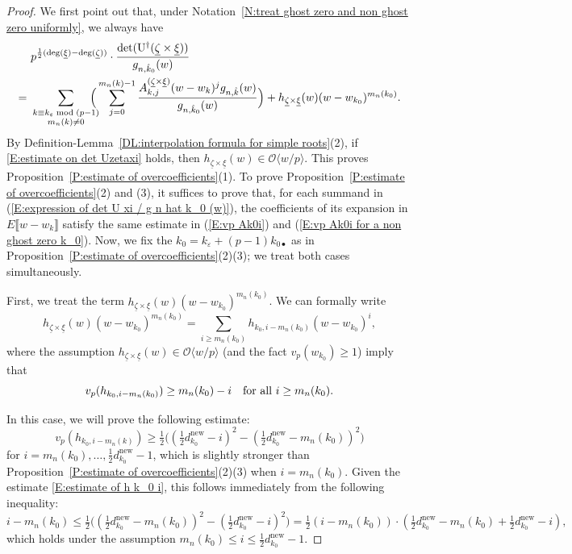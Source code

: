 \documentclass[12pt]{amsart}
\theoremstyle{definition}
\numberwithin{equation}{subsection}
\def\calO{\mathcal{O}}
\def\rmU{\mathrm{U}}
\newcommand{\new}{\mathrm{new}}
\renewcommand{\det}{\mathrm{det}}
\begin{document}
\begin{proof}
We first point out that, under Notation~\ref{N:treat ghost zero and non ghost zero uniformly}, we always have 
	\begin{align}
		\nonumber
		&p^{\frac 12(\deg(\underline \xi)-\deg(\underline \zeta))}\cdot\frac{\det(\rmU^\dagger(\underline \zeta\times \underline \xi) )}{g_{n,\hat{k}_0}(w)}\\
        \label{E:expression of det U xi / g n hat k_0 (w)} =\ &\sum_{\substack{k \equiv k_\varepsilon \bmod{(p-1)}\\ m_n(k) \neq 0 }} \hspace{-10pt} \Big( \sum_{j=0}^{m_n(k)-1} \frac{A_{k,j}^{(\underline \zeta\times \underline \xi)}(w-w_k)^j g_{n,\hat{ k}}(w)}{g_{n,\hat{ k}_0}(w)} \Big)+h_{\underline \zeta\times \underline \xi}(w)(w-w_{k_0})^{m_n(k_0)}.
	\end{align}
By Definition-Lemma~\ref{DL:interpolation formula for simple roots}(2), if \eqref{E:estimate on det Uzetaxi} holds, then $h_{\underline \zeta\times \underline \xi}(w)\in \calO\langle w/p\rangle$. This proves Proposition~\ref{P:estimate of overcoefficients}(1).
To prove Proposition~\ref{P:estimate of overcoefficients}(2) and (3), it suffices to prove that, for each summand in (\ref{E:expression of det U xi / g n hat k_0 (w)}), the coefficients of its expansion in $E\llbracket w-w_k\rrbracket$ satisfy the same estimate in (\ref{E:vp Ak0i}) and (\ref{E:vp Ak0i for a non ghost zero k_0}).
Now, we fix the $k_0 = k_\varepsilon + (p-1)k_{0\bullet}$ as in Proposition~\ref{P:estimate of overcoefficients}(2)(3); we treat both cases simultaneously. 

First, we treat the term $h_{\underline \zeta\times \underline \xi}(w)(w-w_{k_0})^{m_n(k_0)}$. We can formally write
\[
h_{\underline \zeta\times \underline \xi}(w)(w-w_{k_0})^{m_n(k_0)}=\sum_{i\geq m_n(k_0)} h_{k_0,i-m_n(k_0)}(w-w_{k_0})^i,
\]
where the assumption $h_{\underline \zeta\times \underline \xi}(w)\in \calO\langle w/p\rangle$ (and the fact $v_p(w_{k_0})\geq 1$) imply that
\begin{equation}
\label{E:estimate of h k_0 i}
v_p(h_{k_0,i-m_n(k_0)})\geq m_n(k_0)-i \text{\quad for all~} i\geq m_n(k_0).
\end{equation}

In this case, we will prove the following estimate:
\begin{equation}
\label{E:another estimate of h k_0 i}
v_p(h_{k_0,i-m_n(k)})\geq \tfrac 12 \big((\tfrac 12 d_{k_0}^\new-i)^2-(\tfrac 12 d_{k_0}^\new-m_n(k_0))^2  \big)
\end{equation}
for $i=m_n(k_0),\dots, \tfrac 12 d_{k_0}^\new -1$, which is slightly stronger than Proposition~\ref{P:estimate of overcoefficients}(2)(3) when $i = m_n(k_0)$.
Given the estimate \eqref{E:estimate of h k_0 i}, this follows immediately from the following inequality:
	\[
	i-m_n(k_0)\leq \tfrac 12 \big((\tfrac 12 d_{k_0}^\new -m_n(k_0))^2-(\tfrac 12 d_{k_0}^\new -i)^2 \big)=\tfrac 12 (i-m_n(k_0))\cdot (\tfrac 12 d_{k_0}^\new -m_n(k_0)+\tfrac 12 d_{k_0}^\new -i),
	\]
	which holds under the assumption $m_n(k_0)\leq i\leq \tfrac 12 d_{k_0}^\new -1$.
	

\end{proof}
\end{document}
